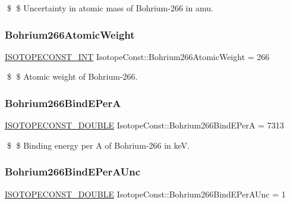 \$ \$ Uncertainty in atomic mass of Bohrium-\/266 in amu. \mbox{\label{group___isotope_const-_bohrium-_bh266_ga23a819516107a7455a9efdf7e7d83df6}} 
\subsubsection{\texorpdfstring{Bohrium266\+Atomic\+Weight}{Bohrium266AtomicWeight}}
{\footnotesize\ttfamily \mbox{\hyperlink{group___isotope_const-_macros_ga5f18360b3e99483a35c32d789e62621c}{I\+S\+O\+T\+O\+P\+E\+C\+O\+N\+S\+T\+\_\+\+I\+NT}} Isotope\+Const\+::\+Bohrium266\+Atomic\+Weight = 266}

\$ \$ Atomic weight of Bohrium-\/266. \mbox{\label{group___isotope_const-_bohrium-_bh266_ga7fc5cd31eeb529b281dbfbfeac3dc812}} 
\subsubsection{\texorpdfstring{Bohrium266\+Bind\+E\+PerA}{Bohrium266BindEPerA}}
{\footnotesize\ttfamily \mbox{\hyperlink{group___isotope_const-_macros_ga8f45a7272ce02c0b4c65c44636ed719a}{I\+S\+O\+T\+O\+P\+E\+C\+O\+N\+S\+T\+\_\+\+D\+O\+U\+B\+LE}} Isotope\+Const\+::\+Bohrium266\+Bind\+E\+PerA = 7313}

\$ \$ Binding energy per A of Bohrium-\/266 in keV. \mbox{\label{group___isotope_const-_bohrium-_bh266_gaea406d786b2af39fff75b39e5c374baa}} 
\subsubsection{\texorpdfstring{Bohrium266\+Bind\+E\+Per\+A\+Unc}{Bohrium266BindEPerAUnc}}
{\footnotesize\ttfamily \mbox{\hyperlink{group___isotope_const-_macros_ga8f45a7272ce02c0b4c65c44636ed719a}{I\+S\+O\+T\+O\+P\+E\+C\+O\+N\+S\+T\+\_\+\+D\+O\+U\+B\+LE}} Isotope\+Const\+::\+Bohrium266\+Bind\+E\+Per\+A\+Unc = 1}

